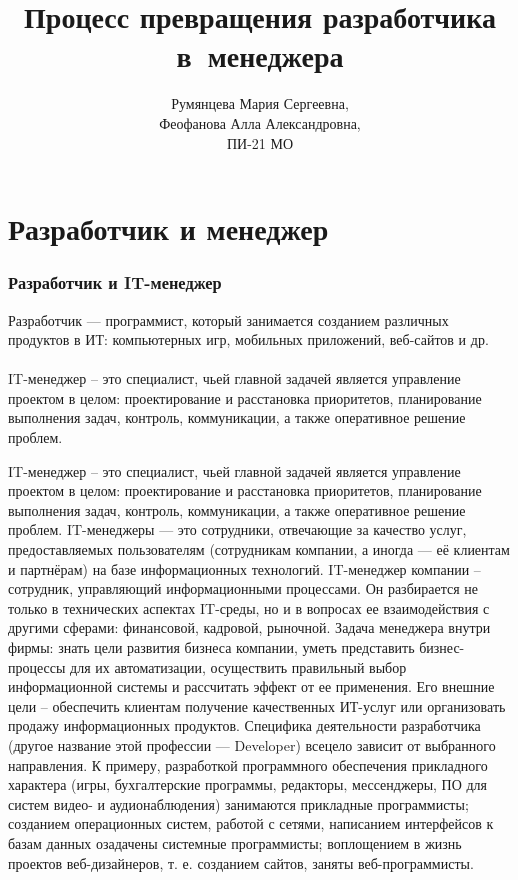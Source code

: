\documentclass{../industrial-development}
\title{Процесс превращения разработчика в~менеджера}
\author{Румянцева Мария Сергеевна, \\Феофанова Алла Александровна, \\ПИ-21 МО}
\date{}
\begin{document}
\begin{frame}
  \titlepage
\end{frame}

\section{Разработчик и менеджер}

\begin{frame} \frametitle{Разработчик и IT-менеджер}
	\alert{Разработчик} — программист, который занимается созданием различных продуктов в ИТ: компьютерных игр, мобильных приложений, веб-сайтов и др. 	\\
~\\
	\alert{IT-менеджер} – это специалист, чьей главной задачей является управление проектом в целом: проектирование и расстановка приоритетов, планирование выполнения задач, контроль, коммуникации, а также оперативное решение проблем.
\end{frame}
\lecturenotes
IT-менеджер – это специалист, чьей главной задачей является управление проектом в целом: проектирование и расстановка приоритетов, планирование выполнения задач, контроль, коммуникации, а также оперативное решение проблем.
IT-менеджеры — это сотрудники, отвечающие за качество услуг, предоставляемых пользователям (сотрудникам компании, а иногда — её клиентам и партнёрам) на базе информационных технологий.
IT-менеджер компании – сотрудник, управляющий информационными процессами. Он разбирается не только в технических аспектах IT-среды, но и в вопросах ее взаимодействия с другими сферами: финансовой, кадровой, рыночной.  Задача менеджера внутри фирмы: знать цели развития бизнеса компании, уметь представить бизнес-процессы для их автоматизации, осуществить правильный выбор информационной системы и рассчитать эффект от ее применения.  Его внешние цели – обеспечить клиентам получение качественных ИТ-услуг или организовать продажу информационных продуктов.
Специфика деятельности разработчика (другое название этой профессии — Developer) всецело зависит от выбранного направления. К примеру, разработкой программного обеспечения прикладного характера (игры‚ бухгалтерские программы‚ редакторы‚ мессенджеры, ПО для систем видео- и аудионаблюдения) занимаются прикладные программисты; созданием операционных систем, работой с сетями, написанием интерфейсов к базам данных озадачены системные программисты; воплощением в жизнь проектов веб-дизайнеров, т. е. созданием сайтов, заняты веб-программисты.
~\cite{How_to_be_a_good_IT-manager}
\end{document}

